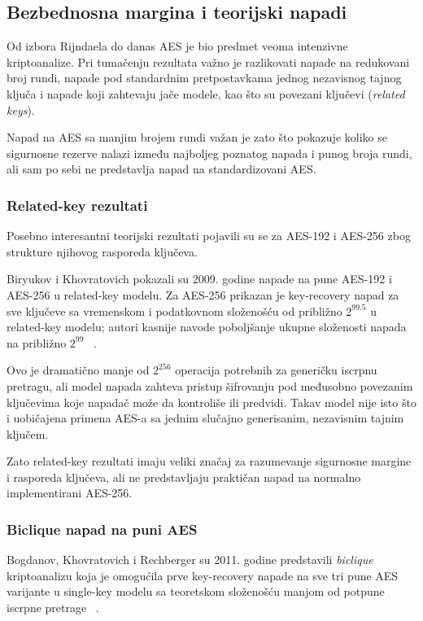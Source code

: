 \subsection{Bezbednosna margina i teorijski napadi}
\label{subsec:aes_cryptanalysis}

Od izbora Rijndaela do danas AES je bio predmet veoma intenzivne
kriptoanalize. Pri tumačenju rezultata važno je razlikovati napade na
redukovani broj rundi, napade pod standardnim pretpostavkama jednog
nezavisnog tajnog ključa i napade koji zahtevaju jače modele, kao što
su povezani ključevi (\emph{related keys}).

Napad na AES sa manjim brojem rundi važan je zato što pokazuje koliko
se sigurnosne rezerve nalazi između najboljeg poznatog napada i punog
broja rundi, ali sam po sebi ne predstavlja napad na standardizovani
AES.


\subsubsection{Related-key rezultati}

Posebno interesantni teorijski rezultati pojavili su se za AES-192 i
AES-256 zbog strukture njihovog rasporeda ključeva.

Biryukov i Khovratovich pokazali su 2009. godine napade na pune
AES-192 i AES-256 u related-key modelu. Za AES-256 prikazan je
key-recovery napad za sve ključeve sa vremenskom i podatkovnom složenošću od približno
$2^{99.5}$ u related-key modelu; autori kasnije navode
poboljšanje ukupne složenosti napada na približno $2^{99}$
~\cite{biryukov-khovratovich-2009}.

Ovo je dramatično manje od $2^{256}$ operacija potrebnih za generičku
iscrpnu pretragu, ali model napada zahteva pristup šifrovanju pod
međusobno povezanim ključevima koje napadač može da kontroliše ili
predvidi. Takav model nije isto što i uobičajena primena AES-a sa
jednim slučajno generisanim, nezavisnim tajnim ključem.

Zato related-key rezultati imaju veliki značaj za razumevanje
sigurnosne margine i rasporeda ključeva, ali ne predstavljaju praktičan
napad na normalno implementirani AES-256.


\subsubsection{Biclique napad na puni AES}

Bogdanov, Khovratovich i Rechberger su 2011. godine predstavili
\emph{biclique} kriptoanalizu koja je omogućila prve key-recovery
napade na sve tri pune AES varijante u single-key modelu sa teoretskom
složenošću manjom od potpune iscrpne pretrage
~\cite{bogdanov-biclique-2011}.

